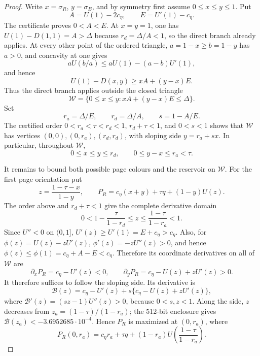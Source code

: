 \begin{proof}
Write \(x=\sigma_R\), \(y=\sigma_B\), and by symmetry first assume
\(0\le x\le y\le1\).  Put
\[
 A=U(1)-2c_\eta,\qquad E=U'(1)-c_\eta.
\]
The certificate proves \(0<A<E\).  At \(x=y=1\), one has
\(U(1)-D(1,1)=A>\Delta\) because \(r_d=\Delta/A<1\), so the direct branch
already applies.  At every other point of the ordered triangle,
\(a=1-x\ge b=1-y\) has \(a>0\), and concavity at one gives
\[
 aU(b/a)\le aU(1)-(a-b)U'(1),
\]
and hence
\[
 U(1)-D(x,y)\ge xA+(y-x)E.                 \tag{5.3}
\]
Thus the direct branch applies outside the closed triangle
\[
 \mathcal W=\{0\le x\le y:xA+(y-x)E\le\Delta\}.
\]
Set
\[
 r_a=\Delta/E,\qquad r_d=\Delta/A,\qquad s=1-A/E.
\]
    The certified order
    \(0<r_a<\tau<r_d<1\), \(r_d+\tau<1\), and \(0<s<1\) shows that
\(\mathcal W\) has vertices
\((0,0),(0,r_a),(r_d,r_d)\), with sloping side \(y=r_a+sx\).
In particular, throughout \(\mathcal W\),
\[
 0\le x\le y\le r_d,\qquad 0\le y-x\le r_a<\tau.
 \tag{5.3a}
\]

It remains to bound both possible page colours and the reservoir on
\(\mathcal W\).  For the first page orientation put
\[
 z=\frac{1-\tau-x}{1-y},\qquad
 P_R=c_\eta(x+y)+\tau q+(1-y)U(z).
\]
The order above and \(r_d+\tau<1\) give the complete derivative domain
\[
 0<1-\frac{\tau}{1-r_d}\le z
 \le\frac{1-\tau}{1-r_a}<1.                 \tag{5.3b}
\]
Since \(U''<0\) on \((0,1]\),
\(U'(z)\ge U'(1)=E+c_\eta>c_\eta\).  Also, for
\(\phi(z)=U(z)-zU'(z)\),
\(\phi'(z)=-zU''(z)>0\), and hence
\(\phi(z)\le\phi(1)=c_\eta+A-E<c_\eta\).  Therefore its coordinate
derivatives on all of \(\mathcal W\) are
\[
 \partial_xP_R=c_\eta-U'(z)<0,\qquad
 \partial_yP_R=c_\eta-U(z)+zU'(z)>0.
\]
It therefore suffices to follow the sloping side.  Its derivative is
\[
 \mathcal B(z)=c_\eta-U'(z)
 +s\{c_\eta-U(z)+zU'(z)\},
\]
where
\(\mathcal B'(z)=(sz-1)U''(z)>0\), because \(0<s,z<1\).  Along the side,
\(z\) decreases from
\(z_a=(1-\tau)/(1-r_a)\); the 512-bit enclosure gives
\(\mathcal B(z_a)<-3.6952685\cdot10^{-4}\).  Hence \(P_R\) is maximized
at \((0,r_a)\), where
\[
 P_R(0,r_a)=c_\eta r_a+\tau q
 +(1-r_a)U\!\left(\frac{1-\tau}{1-r_a}\right).
 \tag{5.4}
\]


\end{proof}
